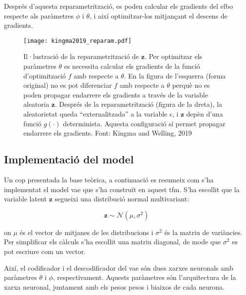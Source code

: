 \documentclass[CAT,BIB]{TFUOC}%
\begin{document}
        Després d'aquesta reparametrització,
        es poden calcular els gradients del \gls{elbo}
        respecte als paràmetres $\phi$ i $\theta$,
        i així optimitzar-los mitjançant el descens de gradients.

        \begin{figure}
            \centering
            \texttt{[image: kingma2019\_reparam.pdf]}
            \caption[Reparametrització de $\mathbf{z}$]{
                Il·lustració de la reparametrització de $\mathbf{z}$.
                Per optimitzar els paràmetres $\theta$
                es necessita calcular els gradients de la funció d'optimització $f$
                amb respecte a $\theta$.
                En la figura de l'esquerra (forma original)
                no es pot diferenciar $f$ amb respecte a $\theta$
                perquè no es poden propagar endarrere els gradients
                a través de la variable aleatoria $\mathbf{z}$.
                Després de la reparametrització (figura de la dreta),
                la aleatorietat queda ``externalitzada'' a la variable $\epsilon$,
                i $\mathbf{z}$ depèn d'una funció $g(\cdot)$ determinista.
                Aquesta configuració sí permet propagar endarrere els gradients.
                Font: Kingma and Welling, 2019 \citep{Kingma2019}
            }
            \label{f:reparametritzacio}
        \end{figure}

    \subsection{Implementació del model}
    \label{s:vae_implementacio}

        Un cop presentada la base teòrica,
        a continuació es resumeix com s'ha implementat el model \gls{vae}
        que s'ha construït en aquest \gls{tfm}.
        S'ha escollit que la variable latent $\mathbf{z}$
        segueixi una distribució normal multivariant:

        $$\mathbf{z} \sim \mathcal{N}(\mu, \sigma^2)$$

        on $\mu$ és el vector de mitjanes de les distribucions
        i $\sigma^2$ és la matriu de variàncies.
        Per simplificar els càlculs s'ha escollit una matriu diagonal,
        de mode que $\sigma^2$ es pot escriure com un vector.

        Així, el codificador i el descodificador del \gls{vae} són
        dues xarxes neuronals amb paràmetres $\theta$ i $\phi$, respectivament.
        Aquests paràmetres són l'arquitectura de la xarxa neuronal,
        juntament amb els pesos pesos i biaixos de cada neurona.
\end{document}
